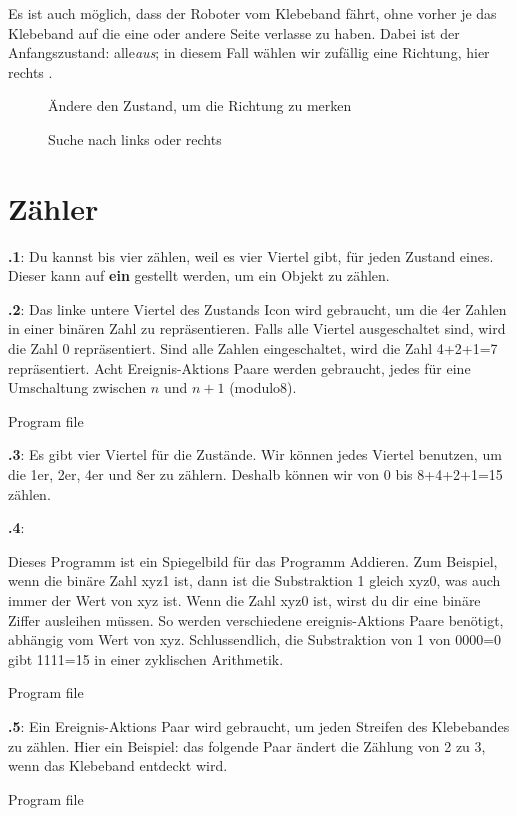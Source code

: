 \documentclass[12pt,a4paper,english]{article}
\begin{document}
Es ist auch möglich, dass der Roboter vom Klebeband fährt, ohne vorher je das Klebeband auf die eine oder andere Seite verlasse zu haben. Dabei ist der Anfangszustand: alle\emph{aus}; in diesem Fall wählen wir zufällig eine Richtung, hier rechts .

\begin{figure}
\begin{center}
\caption{Ändere den Zustand, um die Richtung zu merken}\label{fig.follow3}
\end{center}
\end{figure}

\begin{figure}
\begin{center}
\caption{Suche nach links oder rechts}\label{fig.follow1}
\end{center}
\end{figure}

\section{Zähler}

\textbf{\thesection.1}:
Du kannst bis vier zählen, weil es vier Viertel gibt, für jeden Zustand eines. Dieser kann auf  \textbf{ein} gestellt werden, um ein Objekt zu zählen. 

\textbf{\thesection.2}:
Das linke untere Viertel des Zustands Icon wird gebraucht, um die 4er Zahlen in einer binären Zahl zu repräsentieren. Falls alle Viertel ausgeschaltet sind, wird die Zahl 0 repräsentiert. Sind alle Zahlen eingeschaltet, wird die Zahl 4+2+1=7 repräsentiert. Acht Ereignis-Aktions Paare werden gebraucht, jedes für eine Umschaltung zwischen $n$ und $n+1$ (modulo8).

{\raggedleft \hfill Program file }


\textbf{\thesection.3}:
Es gibt vier Viertel für die Zustände. Wir können jedes Viertel benutzen, um die 1er, 2er, 4er und 8er zu zählern. Deshalb können wir von 0 bis 8+4+2+1=15 zählen.

\textbf{\thesection.4}:

Dieses Programm ist ein Spiegelbild für das Programm Addieren. Zum Beispiel, wenn die binäre Zahl xyz1 ist, dann ist die Substraktion 1 gleich xyz0, was auch immer der Wert von xyz ist. Wenn die Zahl xyz0 ist, wirst du dir eine binäre Ziffer ausleihen müssen. So werden verschiedene ereignis-Aktions Paare benötigt, abhängig vom Wert von xyz. Schlussendlich, die Substraktion von 1 von 0000=0 gibt 1111=15 in einer zyklischen Arithmetik.


{\raggedleft \hfill Program file }

\textbf{\thesection.5}:
Ein Ereignis-Aktions Paar wird gebraucht, um jeden Streifen des Klebebandes zu zählen. Hier ein Beispiel: das folgende Paar ändert die Zählung von 2 zu 3, wenn das Klebeband entdeckt wird.

{\raggedleft \hfill Program file }
\end{document}
